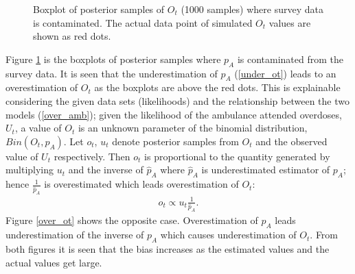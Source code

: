 \documentclass[12pt]{article}
\begin{document}
{\begin{figure}[htb]
	\centering
	\caption[Initial result: box plot of posterior samples of $O_t$ ]{Boxplot of posterior samples of $O_t$ (1000 samples) where survey data is contaminated.  The actual data point of simulated $O_t$ values are shown as red dots.}
	\label{contam_ot}
\end{figure}

\normalsize 
Figure \ref{contam_ot} is the boxplots of posterior samples where $p_A$ is contaminated from the survey data. It is seen that the underestimation of $p_A$ (\ref{under_ot}) leads to an overestimation of $O_t$ as the boxplots are above the red dots. This is explainable considering the given data sets (likelihoods) and the relationship between the two models (\ref{over_amb}); given the likelihood of the ambulance attended overdoses, $U_t$, a value of $O_t$ is an unknown parameter of the binomial distribution, $Bin(O_t, p_A)$. Let $o_t$, $u_t$ denote posterior samples from $O_t$ and the observed value of $U_t$ respectively. Then $o_t$ is proportional to the quantity generated by multiplying $u_t$ and the inverse of $\hat{p}_{A}$ where $\hat{p}_{A}$ is underestimated estimator of $p_A$; hence $\frac{1}{\hat{p}_{A}}$ is overestimated which leads overestimation of $O_t$:
\begin{equation}
\label{ot.how.made}
\begin{aligned}
o_t \propto u_t \frac{1}{\hat{p}_{A}}.
\end{aligned}
\end{equation}
Figure \ref{over_ot} shows the opposite case. Overestimation of $p_A$ leads underestimation of the inverse of $p_A$ which causes underestimation of $O_t$. From both figures it is seen that the bias increases as the estimated values and the actual values get large.\\

}
\end{document}
